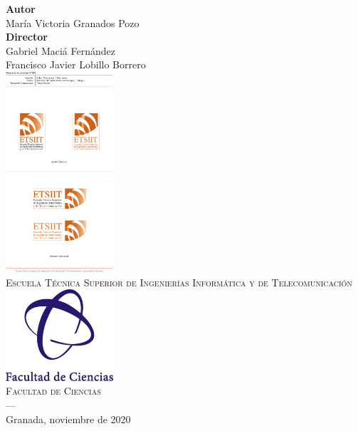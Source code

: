 \begin{titlepage}
\vspace{2.5cm}
\noindent\hspace*{\centeroffset}\begin{minipage}{\textwidth}
\centering

\textbf{Autor}\\ {María Victoria Granados Pozo}\\[2.5ex]
\textbf{Director}\\
{Gabriel Maciá Fernández\\
Francisco Javier Lobillo Borrero 
}\\[2cm]
\includegraphics[width=0.3\textwidth]{portada/imagenes/logoEtsiit.pdf}\\[0.1cm]
\textsc{Escuela Técnica Superior de Ingenierías Informática y de Telecomunicación}\\
\includegraphics[width=0.3\textwidth]{portada/imagenes/logoCiencias.png}\\[0.1cm]
\textsc{Facultad de Ciencias}\\

\textsc{---}\\
Granada, noviembre de 2020
\end{minipage}
\end{titlepage}


